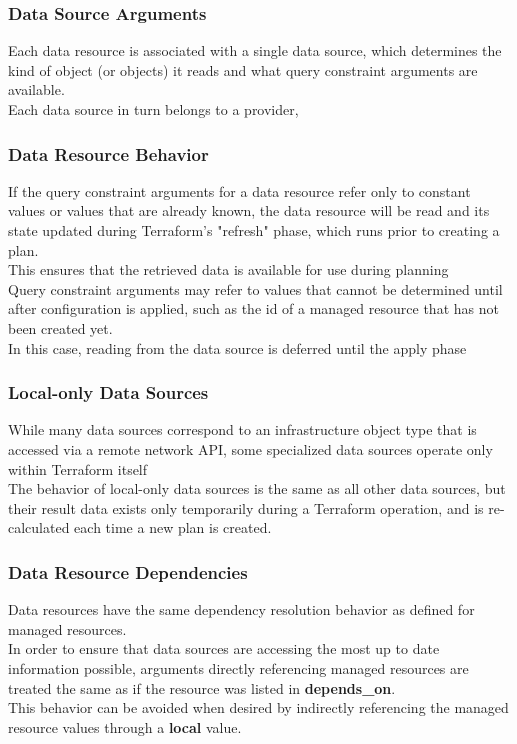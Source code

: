 \documentclass[12pt, letterpaper, twoside]{article}
\begin{document}
\subsubsection{Data Source Arguments}
Each data resource is associated with a single data source, which determines the kind of object 
(or objects) it reads and what query constraint arguments are available.\\
Each data source in turn belongs to a provider, 

\subsubsection{Data Resource Behavior}
If the query constraint arguments for a data resource refer only to constant values or values that 
are already known, the data resource will be read and its state updated during Terraform's "refresh"
phase, which runs prior to creating a plan.\\
This ensures that the retrieved data is available for use during planning\\

Query constraint arguments may refer to values that cannot be determined until after configuration 
is applied, such as the id of a managed resource that has not been created yet.\\
In this case, reading from the data source is deferred until the apply phase

\subsubsection{Local-only Data Sources}
While many data sources correspond to an infrastructure object type that is accessed via a remote 
network API, some specialized data sources operate only within Terraform itself\\

The behavior of local-only data sources is the same as all other data sources, but their result data 
exists only temporarily during a Terraform operation, and is re-calculated each time a new plan is 
created.

\subsubsection{Data Resource Dependencies}
Data resources have the same dependency resolution behavior as defined for managed resources.\\

In order to ensure that data sources are accessing the most up to date information possible, 
arguments directly referencing managed resources are treated the same as if the resource was 
listed in \textbf{depends\_on}.\\
This behavior can be avoided when desired by indirectly referencing the managed resource 
values through a \textbf{local} value.
\end{document}
